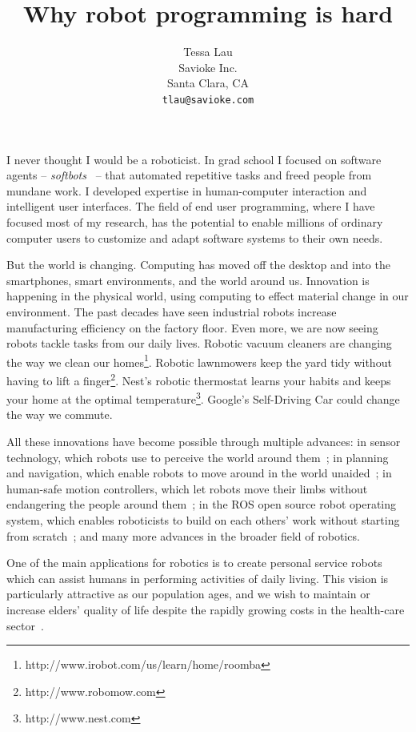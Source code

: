 \documentclass[10pt,twocolumn]{article}
\begin{document}
\title {Why robot programming is hard}
\author {Tessa Lau \\
Savioke Inc.\\
Santa Clara, CA\\
{\tt tlau@savioke.com}
}
\maketitle



I never thought I would be a roboticist. In grad school I focused on software agents -- {\em softbots}~\cite{etzioni-cacm94} -- that automated repetitive tasks and freed people from mundane work.  I developed expertise in human-computer interaction and intelligent user interfaces. The field of end user programming, where I have focused most of my research, has the potential to enable millions of ordinary computer users to customize and adapt software systems to their own needs.

But the world is changing. Computing has moved off the desktop and into the smartphones, smart environments, and the world around us. Innovation is happening in the physical world, using computing to effect material change in our environment. The past decades have seen industrial robots increase manufacturing efficiency on the factory floor. Even more, we are now seeing robots tackle tasks from our daily lives. Robotic vacuum cleaners are changing the way we clean our homes\footnote{http://www.irobot.com/us/learn/home/roomba}. Robotic lawnmowers keep the yard tidy without having to lift a finger\footnote{http://www.robomow.com}. Nest's robotic thermostat learns your habits and keeps your home at the optimal temperature\footnote{http://www.nest.com}. Google's Self-Driving Car could change the way we commute.

All these innovations have become possible through multiple advances: in sensor technology, which robots use to perceive the world around them~\cite{henry-iser10}; in planning and navigation, which enable robots to move around in the world unaided~\cite{jackel-cacm07}; in human-safe motion controllers, which let robots move their limbs without endangering the people around them~\cite{kemp-ieee07}; in the ROS open source robot operating system, which enables roboticists to build on each others' work without starting from scratch~\cite{quigley-icra09}; and many more advances in the broader field of robotics.

One of the main applications for robotics is to create personal service robots which can assist humans in performing activities of daily living. This vision is particularly attractive as our population ages, and we wish to maintain or increase elders' quality of life despite the rapidly growing costs in the health-care sector~\cite{roy-wire00}.
\end{document}
